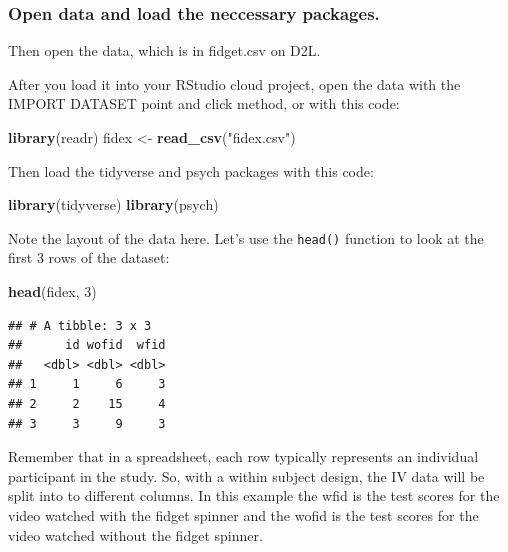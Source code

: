 \documentclass[
]{book}
\newenvironment{Shaded}{\begin{snugshade}}{\end{snugshade}}
\newcommand{\DecValTok}[1]{\textcolor[rgb]{0.00,0.00,0.81}{#1}}
\newcommand{\KeywordTok}[1]{\textcolor[rgb]{0.13,0.29,0.53}{\textbf{#1}}}
\newcommand{\NormalTok}[1]{#1}
\newcommand{\StringTok}[1]{\textcolor[rgb]{0.31,0.60,0.02}{#1}}
\begin{document}
\hypertarget{open-data-and-load-the-neccessary-packages.}{%
\subsubsection{Open data and load the neccessary packages.}\label{open-data-and-load-the-neccessary-packages.}}

Then open the data, which is in fidget.csv on D2L.

After you load it into your RStudio cloud project, open the data with the IMPORT DATASET point and click method, or with this code:

\begin{Shaded}
\begin{Highlighting}[]
\KeywordTok{library}\NormalTok{(readr)}
\NormalTok{fidex <-}\StringTok{ }\KeywordTok{read_csv}\NormalTok{(}\StringTok{"fidex.csv"}\NormalTok{)}
\end{Highlighting}
\end{Shaded}

Then load the tidyverse and psych packages with this code:

\begin{Shaded}
\begin{Highlighting}[]
\KeywordTok{library}\NormalTok{(tidyverse)}
\KeywordTok{library}\NormalTok{(psych)}
\end{Highlighting}
\end{Shaded}

Note the layout of the data here. Let's use the \texttt{head()} function to look at the first 3 rows of the dataset:

\begin{Shaded}
\begin{Highlighting}[]
\KeywordTok{head}\NormalTok{(fidex, }\DecValTok{3}\NormalTok{)}
\end{Highlighting}
\end{Shaded}

\begin{verbatim}
## # A tibble: 3 x 3
##      id wofid  wfid
##   <dbl> <dbl> <dbl>
## 1     1     6     3
## 2     2    15     4
## 3     3     9     3
\end{verbatim}

Remember that in a spreadsheet, each row typically represents an individual participant in the study. So, with a within subject design, the IV data will be split into to different columns. In this example the wfid is the test scores for the video watched with the fidget spinner and the wofid is the test scores for the video watched without the fidget spinner.
\end{document}
